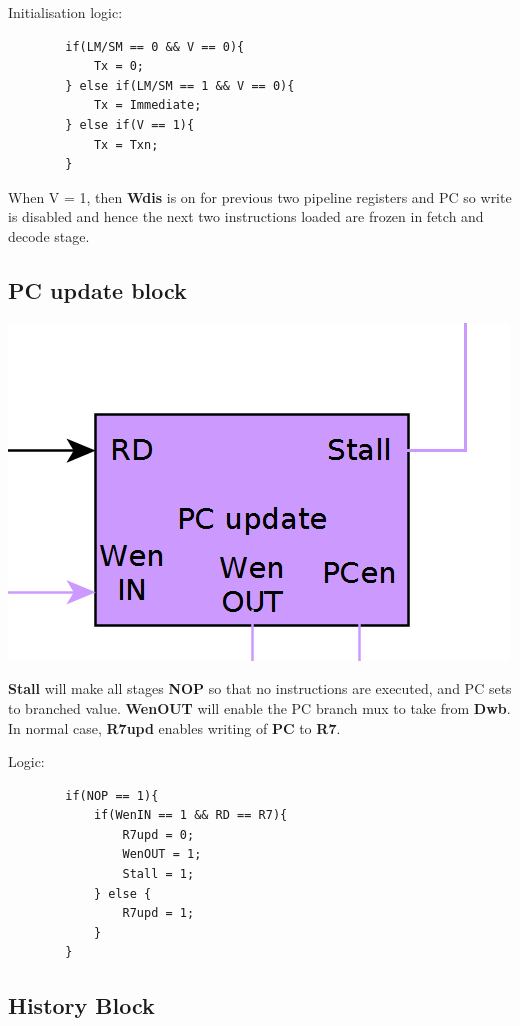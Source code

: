 \documentclass{article}
\begin{document}
Initialisation logic:
    \begin{lstlisting}
        if(LM/SM == 0 && V == 0){
            Tx = 0;
        } else if(LM/SM == 1 && V == 0){
            Tx = Immediate;
        } else if(V == 1){
            Tx = Txn;
        }
    \end{lstlisting}

When V = 1, then \textbf{Wdis} is on for previous two pipeline registers and PC
so write is disabled and hence the next two instructions loaded are frozen in
fetch and decode stage.

\subsection*{PC update block}

\includegraphics[scale=0.5]{pc}

\textbf{Stall} will make all stages \textbf{NOP} so that no instructions are executed,
and PC sets to branched value.
\textbf{WenOUT} will enable the PC branch mux to take from \textbf{Dwb}.
In normal case, \textbf{R7upd} enables writing of \textbf{PC} to \textbf{R7}.

Logic:
    \begin{lstlisting}
        if(NOP == 1){
            if(WenIN == 1 && RD == R7){
                R7upd = 0;
                WenOUT = 1;
                Stall = 1;
            } else {
                R7upd = 1;
            }
        }
    \end{lstlisting}


\subsection*{History Block}
\end{document}
